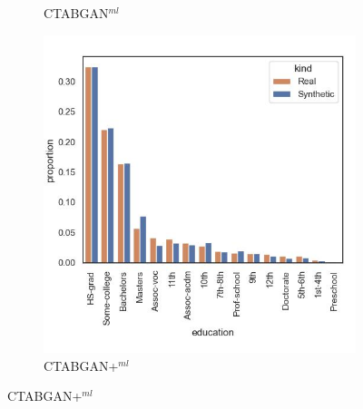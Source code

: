 \begin{figure}[t]
\begin{subfigure}{0.32\textwidth}
		\caption{CTABGAN$^{ml}$}
	\end{subfigure}
	\begin{subfigure}{0.32\textwidth}
		\centering
		\includegraphics[width=\textwidth]{images/dist_education/ctabgan+.jpg}
		\caption{CTABGAN+$^{ml}$}
	\end{subfigure}



\end{figure}
